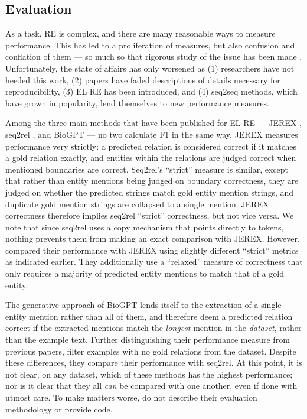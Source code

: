 \documentclass[11pt]{article}
\begin{document}
\subsection{Evaluation \label{subsec:evaluation}}

As a task, RE is complex, and there are many reasonable ways to measure performance.  This has led to a proliferation of measures, but also confusion and conflation of them --- so much so that rigorous study of the issue has been made \cite{taille2020let}. Unfortunately, the state of affairs has only worsened as (1) researchers have not heeded this work, (2) papers have faded descriptions of details necessary for reproducibility, (3) EL RE has been introduced, and (4) seq2seq methods, which have grown in popularity, lend themselves to new performance measures. 

Among the three main methods that have been published for EL RE --- JEREX \cite{eberts-ulges-2021-end}, seq2rel \cite{giorgi-etal-2022-sequence}, and BioGPT \cite{luo2022biogpt} --- no two calculate F1 in the same way.  JEREX measures performance very strictly: a predicted relation is considered correct if it matches a gold relation exactly, and entities within the relations are judged correct when mentioned boundaries are correct. Seq2rel's ``strict'' measure is similar, except that rather than entity mentions being judged on boundary correctness, they are judged on whether the predicted strings match gold entity mention strings, and duplicate gold mention strings are collapsed to a single mention.  JEREX correctness therefore implies seq2rel ``strict'' correctness, but not vice versa.  We note that since seq2rel uses a copy mechanism that points directly to tokens, nothing prevents them from making an exact comparison with JEREX.  However, \citet{giorgi-etal-2022-sequence} compared their performance with JEREX using slightly different ``strict'' metrics as indicated earlier.  They additionally use a ``relaxed'' measure of correctness that only requires a majority of predicted entity mentions to match that of a gold entity.  

The generative approach of BioGPT lends itself to the extraction of a single entity mention rather than all of them, and therefore  \citet{luo2022biogpt} deem a predicted relation correct if the extracted mentions match the \emph{longest} mention in the \emph{dataset}, rather than the example text.  Further distinguishing their performance measure from previous papers, \citet{luo2022biogpt} filter examples with no gold relations from the dataset.  Despite these differences, they compare their performance with seq2rel. At this point, it is not clear, on any dataset, which of these methods has the highest performance; nor is it clear that they all \emph{can} be compared with one another, even if done with utmost care.  To make matters worse, \citet{jahan-etal-2023-evaluation} do not describe their evaluation methodology or provide code.
\end{document}
